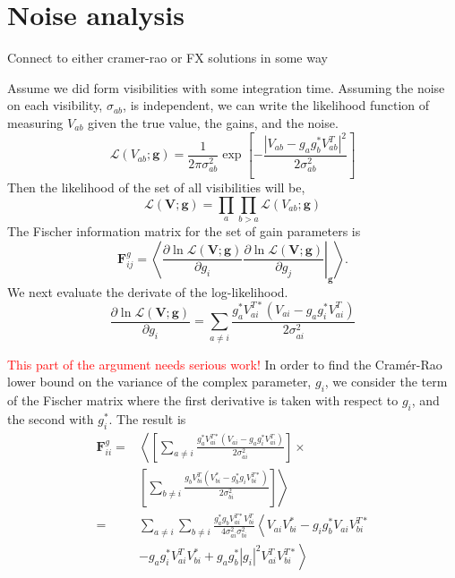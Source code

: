 \documentclass[a4paper,fleqn,usenatbib]{../mnras}
\begin{document}
\section{Noise analysis}\label{sec:noise}

Connect to either cramer-rao or FX solutions in some way

Assume we did form visibilities with some integration time. Assuming the noise on each visibility, $\sigma_{ab}$, is independent, we can write the likelihood function of measuring $V_{ab}$ given the true value, the gains, and the noise.
\begin{equation}
\mathcal{L}(V_{ab};\mathbf{g}) = \frac{1}{2\pi \sigma_{ab}^2}\exp\left[-\frac{\left|V_{ab} - g_a g_b^* V_{ab}^T\right|^2}{2\sigma_{ab}^2}\right]
\end{equation}
Then the likelihood of the set of all visibilities will be,
\begin{equation}
\mathcal{L}(\mathbf{V};\mathbf{g}) = \prod_a \prod_{b > a} \mathcal{L}(V_{ab};\mathbf{g})
\end{equation}
The Fischer information matrix for the set of gain parameters is
\begin{equation}
\mathbf{F}^g_{ij} = \left<\left. \frac{\partial \ln \mathcal{L}(\mathbf{V};\mathbf{g})}{\partial g_i} \frac{\partial \ln \mathcal{L}(\mathbf{V};\mathbf{g})}{\partial g_j}\right|_\mathbf{g}\right>.
\end{equation}
We next evaluate the derivate of the log-likelihood.
\begin{equation}
\frac{\partial \ln \mathcal{L}(\mathbf{V};\mathbf{g})}{\partial g_i} = 
\sum_{a \ne i} \frac{g_a^* V_{ai}^{T*} (V_{ai} - g_a g_i^* V_{ai}^T)}{2 \sigma_{ai}^2}
\end{equation}

\textcolor{red}{This part of the argument needs serious work!} In order to find the Cram\'er-Rao lower bound on the variance of the complex parameter, $g_i$, we consider the term of the Fischer matrix where the first derivative is taken with respect to $g_i$, and the second with $g_i^*$. The result is
\begin{align}
\mathbf{F}^g_{ii} = & \left<\left[ \sum_{a \ne i} \frac{g_a^* V_{ai}^{T*} (V_{ai} - g_a g_i^* V_{ai}^T)}{2 \sigma_{ai}^2} \right] \right. \times \nonumber \\
& \left. \left[ \sum_{b \ne i} \frac{g_b V_{bi}^{T} (V_{bi}^* - g_b^* g_i V_{bi}^{T*})}{2 \sigma_{bi}^2} \right] \right> \nonumber \\
= &\sum_{a\ne i} \sum_{b \ne i} \frac{g_a^* g_b V_{ai}^{T*} V_{bi}^T}{4 \sigma_{ai}^2 \sigma_{bi}^2} \left< V_{ai}V_{bi}^* - g_i g_b^* V_{ai}V_{bi}^{T*}\nonumber \right.\\
&\left. - g_a g_i^* V_{ai}^T V_{bi}^* + g_a g_b^* |g_i|^2 V_{ai}^T V_{bi}^{T*}\right>
\label{eq:Fischer_before_expect}
\end{align}
\end{document}
